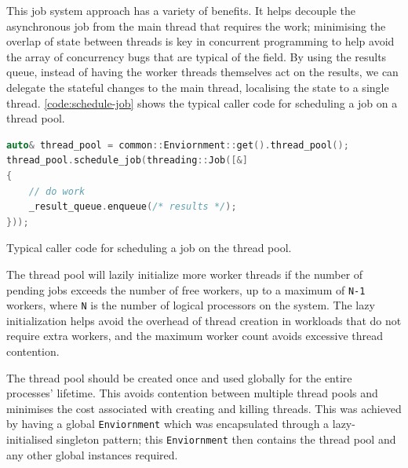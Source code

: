 This job system approach has a variety of benefits. It helps decouple the asynchronous job from the main thread that requires the work; minimising the overlap of state between threads is key in concurrent programming to help avoid the array of concurrency bugs that are typical of the field. By using the results queue, instead of having the worker threads themselves act on the results, we can delegate the stateful changes to the main thread, localising the state to a single thread. \autoref{code:schedule-job} shows the typical caller code for scheduling a job on a thread pool.

\begin{lstfloat}[H]
    \begin{lstlisting}[language=c++]
auto& thread_pool = common::Enviornment::get().thread_pool();
thread_pool.schedule_job(threading::Job([&]
{
    // do work
    _result_queue.enqueue(/* results */);
}));
    \end{lstlisting}
    \caption{Typical caller code for scheduling a job on the thread pool.}
    \label{code:schedule-job}
\end{lstfloat}

The thread pool will lazily initialize more worker threads if the number of pending jobs exceeds the number of free workers, up to a maximum of \texttt{N-1} workers, where \texttt{N} is the number of logical processors on the system. The lazy initialization helps avoid the overhead of thread creation in workloads that do not require extra workers, and the maximum worker count avoids excessive thread contention.

The thread pool should be created once and used globally for the entire processes' lifetime. This avoids contention between multiple thread pools and minimises the cost associated with creating and killing threads. This was achieved by having a global \texttt{Enviornment} which was encapsulated through a lazy-initialised singleton pattern; this \texttt{Enviornment} then contains the thread pool and any other global instances required.



 \cite{moodycamel, moodycamel-benchmark}

